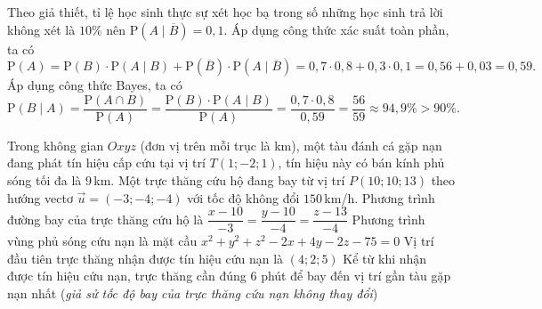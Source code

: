 \begin{ex}
{\begin{itemchoice}
			\itemch 
			Theo giả thiết, tỉ lệ học sinh thực sự xét học bạ trong số những học sinh trả lời không xét là $10\%$ nên $\mathrm{P}\left(A\mid \overline{B}\right)= 0{,}1$.
			\itemch 
			Áp dụng công thức xác suất toàn phần, ta có
			\[\mathrm{P}(A)=\mathrm{P}(B)\cdot\mathrm{P}(A\mid B)+\mathrm{P}\left(\overline{B}\right)\cdot\mathrm{P}\left(A\mid\overline{B}\right)=0{,}7\cdot 0{,}8+0{,}3\cdot 0{,}1=0{,}56+0{,}03=0{,}59.\]
			\itemch 
			Áp dụng công thức Bayes, ta có
			\[\mathrm{P}(B\mid A)=\dfrac{\mathrm{P}(A\cap B)}{\mathrm{P}(A)}=\dfrac{\mathrm{P}(B)\cdot \mathrm{P}(A\mid B)}{\mathrm{P}(A)}=\dfrac{0{,}7\cdot 0{,}8}{0{,}59}=\dfrac{56}{59}\approx 94{,}9\%>90\%.\]
		\end{itemchoice}
	}
\end{ex}

\begin{ex}%
	Trong không gian $Oxyz$ (đơn vị trên mỗi trục là km), một tàu đánh cá gặp nạn đang phát tín hiệu cấp cứu tại vị trí $T(1;-2;1)$, tín hiệu này có bán kính phủ sóng tối đa là $9$\,km. Một trực thăng cứu hộ đang bay từ vị trí $P(10;10;13)$ theo hướng vectơ $\overrightarrow{u}=(-3; -4;-4)$ với tốc độ không đổi $150$\,km/h.
	\choiceTF
		{\True Phương trình đường bay của trực thăng cứu hộ là $\dfrac{x-10}{-3}=\dfrac{y-10}{-4}=\dfrac{z-13}{-4}$}
		{\True Phương trình vùng phủ sóng cứu nạn là mặt cầu $x^2+y^2+z^2-2x+4y-2z-75=0$}
		{Vị trí đầu tiên trực thăng nhận được tín hiệu cứu nạn là $(4;2;5)$}
		{Kể từ khi nhận được tín hiệu cứu nạn, trực thăng cần đúng $6$ phút để bay đến vị trí gần tàu gặp nạn nhất (\textit{giả sử tốc độ bay của trực thăng cứu nạn không thay đổi})}
\end{ex}
